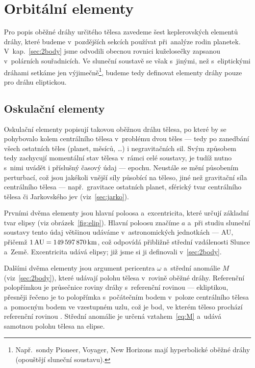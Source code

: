 \documentclass[A4paper, 12pt, oneside]{book}
\begin{document}
\pagebreak
\section{Orbitální elementy} \label{sec:orbelem}
Pro popis oběžné dráhy určitého tělesa zavedeme šest keplerovských elementů dráhy, které budeme v~pozdějších sekcích používat při~analýze rodin planetek. V~kap.~\ref{sec:2body} jsme odvodili obecnou rovnici kuželosečky zapsanou v~polárních souřadnicích. Ve sluneční soustavě se však s~jinými, než s~eliptickými dráhami setkáme jen výjimečně\footnote{Např.\ sondy Pioneer, Voyager, New Horizons mají hyperbolické oběžné dráhy (opouštějí sluneční soustavu).}, budeme tedy definovat elementy dráhy pouze pro dráhu eliptickou.
\subsection{Oskulační elementy}
Oskulační elementy popisují takovou oběžnou dráhu tělesa, po které by se pohybovalo kolem centrálního tělesa v~problému dvou těles --- tedy po zanedbání všech ostatních těles (planet, měsíců, \ldots) i negravitačních sil. Svým způsobem tedy zachycují momentální stav tělesa v~rámci celé soustavy, je tudíž nutno s~nimi uvádět i příslušný časový údaj --- epochu. Neustále se mění působením perturbací, což jsou jakékoli vnější síly působící na těleso, jiné než gravitační síla centrálního tělesa --- např.\ gravitace ostatních planet, sférický tvar centrálního tělesa či Jarkovského jev (viz~\ref{sec:jarko}).

Prvními dvěma elementy jsou hlavní poloosa a~excentricita, které určují základní tvar elipsy (viz obrázek~\ref{fig:elip}). Hlavní poloosu značíme $a$ a~při studiu sluneční soustavy tento údaj většinou udáváme v~astronomických jednotkách --- AU, přičemž $1\, {\rm AU} = 149\,597\,870\,{\rm km}$, což odpovídá přibližně střední vzdálenosti Slunce a~Země. Excentricita udává  elipsy; již jsme si ji definovali v~\ref{sec:2body}.

Dalšími dvěma elementy jsou argument pericentra $\omega$ a~střední anomálie $M$ (viz~\ref{sec:2body}), které udávají polohu tělesa v~rovině oběžné dráhy. Referenční polopřímkou je průsečnice roviny dráhy s~referenční rovinou --- ekliptikou, přesněji řečeno je to polopřímka s~počátečním bodem v~poloze centrálního tělesa a~pomocným bodem ve vzestupném uzlu, což je bod, ve kterém těleso prochází referenční rovinou . Střední anomálie je určená vztahem~\eqref{eq:M} a~udává samotnou polohu tělesa na elipse.
\end{document}
